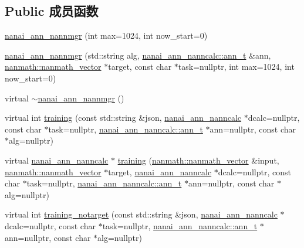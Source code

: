 \subsection*{Public 成员函数}
\begin{DoxyCompactItemize}
\item 
\hyperlink{classnanai_1_1nanai__ann__nannmgr_ac0ab089eae09f4d317218fcad3cfe804}{nanai\+\_\+ann\+\_\+nannmgr} (int max=1024, int now\+\_\+start=0)
\item 
\hyperlink{classnanai_1_1nanai__ann__nannmgr_a6901546a2000f2ec793b2845d070d73a}{nanai\+\_\+ann\+\_\+nannmgr} (std\+::string alg, \hyperlink{classnanai_1_1nanai__ann__nanncalc_1_1ann__t}{nanai\+\_\+ann\+\_\+nanncalc\+::ann\+\_\+t} \&ann, \hyperlink{classnanmath_1_1nanmath__vector}{nanmath\+::nanmath\+\_\+vector} $\ast$target, const char $\ast$task=nullptr, int max=1024, int now\+\_\+start=0)
\item 
virtual \hyperlink{classnanai_1_1nanai__ann__nannmgr_a2594f0a16aed65087e4aebca1b07894e}{$\sim$nanai\+\_\+ann\+\_\+nannmgr} ()
\item 
virtual int \hyperlink{classnanai_1_1nanai__ann__nannmgr_a9ce2dbf3146a70c2a32209820489d1c2}{training} (const std\+::string \&json, \hyperlink{classnanai_1_1nanai__ann__nanncalc}{nanai\+\_\+ann\+\_\+nanncalc} $\ast$dcalc=nullptr, const char $\ast$task=nullptr, \hyperlink{classnanai_1_1nanai__ann__nanncalc_1_1ann__t}{nanai\+\_\+ann\+\_\+nanncalc\+::ann\+\_\+t} $\ast$ann=nullptr, const char $\ast$alg=nullptr)
\item 
virtual \hyperlink{classnanai_1_1nanai__ann__nanncalc}{nanai\+\_\+ann\+\_\+nanncalc} $\ast$ \hyperlink{classnanai_1_1nanai__ann__nannmgr_a1b99f051a2a7b2b1ebb21bb45d567afa}{training} (\hyperlink{classnanmath_1_1nanmath__vector}{nanmath\+::nanmath\+\_\+vector} \&input, \hyperlink{classnanmath_1_1nanmath__vector}{nanmath\+::nanmath\+\_\+vector} $\ast$target, \hyperlink{classnanai_1_1nanai__ann__nanncalc}{nanai\+\_\+ann\+\_\+nanncalc} $\ast$dcalc=nullptr, const char $\ast$task=nullptr, \hyperlink{classnanai_1_1nanai__ann__nanncalc_1_1ann__t}{nanai\+\_\+ann\+\_\+nanncalc\+::ann\+\_\+t} $\ast$ann=nullptr, const char $\ast$alg=nullptr)
\item 
virtual int \hyperlink{classnanai_1_1nanai__ann__nannmgr_a3fac18a4d69722ed887e89d4aebb3361}{training\+\_\+notarget} (const std\+::string \&json, \hyperlink{classnanai_1_1nanai__ann__nanncalc}{nanai\+\_\+ann\+\_\+nanncalc} $\ast$dcalc=nullptr, const char $\ast$task=nullptr, \hyperlink{classnanai_1_1nanai__ann__nanncalc_1_1ann__t}{nanai\+\_\+ann\+\_\+nanncalc\+::ann\+\_\+t} $\ast$ann=nullptr, const char $\ast$alg=nullptr)

\end{DoxyCompactItemize}
